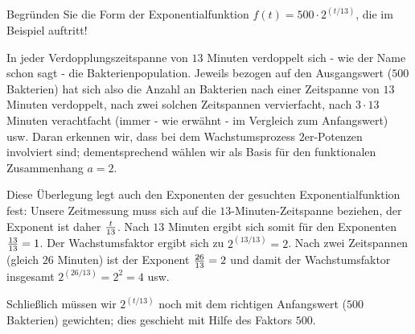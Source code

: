 \begin{MContent}
\begin{MExercise}
 Begründen Sie die Form der Exponentialfunktion $f(t) = 500 \cdot 2^{(t/13)}$, die im Beispiel
  auftritt! \begin{MHint}{\iSolution}
  In jeder Verdopplungszeitspanne von $13$ Minuten verdoppelt sich - wie der Name schon sagt - die Bakterienpopulation.
  Jeweils bezogen auf den Ausgangswert ($500$ Bakterien) hat sich also die Anzahl an Bakterien nach einer Zeitspanne von $13$
  Minuten verdoppelt, nach zwei solchen Zeitspannen vervierfacht, nach $3 \cdot 13$ Minuten verachtfacht (immer - wie erwähnt -
  im Vergleich zum Anfangswert) usw. Daran erkennen wir, dass bei dem Wachstumsprozess $2$er-Potenzen involviert sind;
  dementsprechend wählen wir als Basis für den funktionalen Zusammenhang $a = 2$.
  
  Diese Überlegung legt auch den Exponenten der gesuchten Exponentialfunktion fest: Unsere Zeitmessung muss sich auf die
  $13$-Minuten-Zeitspanne beziehen, der Exponent ist daher $\tfrac{t}{13}$. Nach $13$ Minuten ergibt sich somit für den 
  Exponenten $\tfrac{13}{13} = 1$. Der Wachstumsfaktor ergibt sich zu $2^{(13/13)}=2$. Nach zwei Zeitspannen (gleich $26$ Minuten) ist der Exponent $\tfrac{26}{13} = 2$ 
  und damit der Wachstumsfaktor insgesamt $2^{(26/13)} = 2^2 = 4$ usw.
  
  Schließlich müssen wir $2^{(t/13)}$ noch mit dem richtigen Anfangswert ($500$ Bakterien) gewichten;
  dies geschieht mit Hilfe des Faktors $500$.
 \end{MHint}
\end{MExercise}
\end{MContent}

